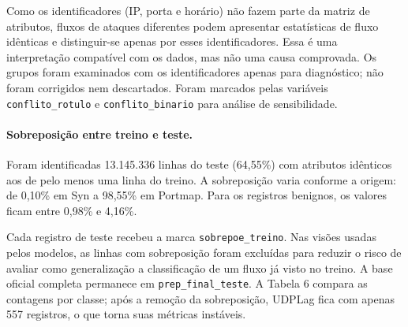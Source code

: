 \documentclass[
    12pt,                %
    openright,           %
    oneside,             %
    a4paper,             %
    english,             %
    brazil               %
]{abntex2}
\begin{document}
Como os identificadores (IP, porta e horário) não fazem parte da matriz de atributos, fluxos de ataques diferentes podem apresentar estatísticas de fluxo idênticas e distinguir-se apenas por esses identificadores. Essa é uma interpretação compatível com os dados, mas não uma causa comprovada. Os grupos foram examinados com os identificadores apenas para diagnóstico; não foram corrigidos nem descartados. Foram marcados pelas variáveis \texttt{conflito\_rotulo} e \texttt{conflito\_binario} para análise de sensibilidade.

\paragraph{Sobreposição entre treino e teste.}
Foram identificadas 13.145.336 linhas do teste (64,55\%) com atributos idênticos aos de pelo menos uma linha do treino. A sobreposição varia conforme a origem: de 0,10\% em Syn a 98,55\% em Portmap. Para os registros benignos, os valores ficam entre 0,98\% e 4,16\%.

Cada registro de teste recebeu a marca \texttt{sobrepoe\_treino}. Nas visões usadas pelos modelos, as linhas com sobreposição foram excluídas para reduzir o risco de avaliar como generalização a classificação de um fluxo já visto no treino. A base oficial completa permanece em \texttt{prep\_final\_teste}. A Tabela 6 compara as contagens por classe; após a remoção da sobreposição, UDPLag fica com apenas 557 registros, o que torna suas métricas instáveis.
\end{document}
